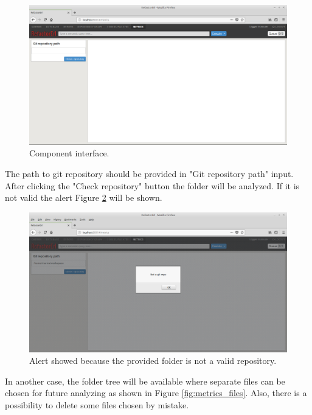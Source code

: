 \begin{figure}[ht]
	\includegraphics[width=\textwidth]{figures/metrics.png}
	\caption{Component interface.}
	\label{fig:metrics_interface}
\end{figure}

The path to git repository should be provided in "Git repository path" input. After clicking the "Check repository" button the folder will be analyzed. If it is not valid the alert Figure \ref{fig:metrics_alert} will be shown.  

\begin{figure}[ht]
	\includegraphics[width=\textwidth]{figures/alert.png}
	\caption{Alert showed because the provided folder is not a valid repository.}
	\label{fig:metrics_alert}
\end{figure}

In another case, the folder tree will be available where separate files can be chosen for future analyzing as shown in Figure \ref{fig:metrics_files}. Also, there is a possibility to delete some files chosen by mistake.


